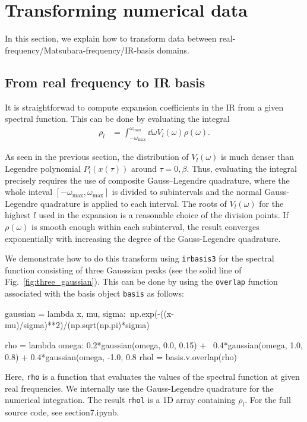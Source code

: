 \documentclass[submission, LectureNotes]{SciPost}
\newcommand{\wmax}{\ensuremath{{\omega_\mathrm{max}}}}
\begin{document}
\section{Transforming numerical data}
In this section,
we explain how to transform data between real-frequency/Matsubara-frequency/IR-basis domains.

\subsection{From real frequency to IR basis}
It is straightforwad to compute expansion coefficients in the IR 
from a given spectral function.
This can be done by evaluating the integral
\begin{align}
    \rho_l &= \int_{-\wmax}^\wmax \dd \omega V_l(\omega) \rho(\omega).
\end{align}

As seen in the previous section,
the distribution of $V_l(\omega)$ is much denser than Legendre polynomial $P_l(x(\tau))$ around $\tau=0, \beta$.
Thus, evaluating the integral precisely requires the use of composite Gauss–Legendre quadrature,
where the whole inteval $[-\wmax, \wmax]$ is divided to subintervals and the normal Gauss-Legendre quadrature is 
applied to each interval.
The roots of $V_l(\omega)$ for the highest $l$ used in the expansion
is a reasonable choice of the division points.
If $\rho(\omega)$ is smooth enough within each subinterval,
the result converges exponentially with increasing the degree of the Gauss-Legendre quadrature.

We demonstrate how to do this transform using \texttt{irbasis3} for the spectral function consisting 
of three Gausssian peaks (see the solid line of Fig.~\ref{fig:three_gaussian}).
This can be done by using the \texttt{overlap} function associated with the basis object \texttt{basis}
as follows:
\begin{python}
gaussian = lambda x, mu, sigma:\
    np.exp(-((x-mu)/sigma)**2)/(np.sqrt(np.pi)*sigma)

rho = lambda omega: 0.2*gaussian(omega, 0.0, 0.15) + \
    0.4*gaussian(omega, 1.0, 0.8) + 0.4*gaussian(omega, -1.0, 0.8
rhol = basis.v.overlap(rho)
\end{python}
Here, \texttt{rho} is a function that evaluates the values of the spectral function at given real frequencies.
We internally use the Gauss-Legendre quadrature for the numerical integration.
The result \texttt{rhol} is a 1D array containing $\rho_l$.
For the full source code, see section7.ipynb.
\end{document}
